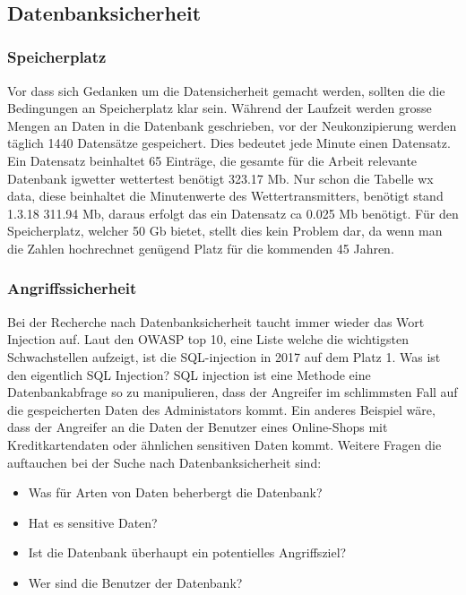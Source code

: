 \\

\subsection{Datenbanksicherheit}
\subsubsection{Speicherplatz}
Vor dass sich Gedanken um die Datensicherheit gemacht werden, sollten die die Bedingungen an Speicherplatz klar sein. Während der Laufzeit werden grosse Mengen an Daten in die Datenbank geschrieben, vor der Neukonzipierung werden täglich 1440 Datensätze gespeichert. Dies bedeutet jede Minute einen Datensatz. Ein Datensatz beinhaltet 65 Einträge, die gesamte für die Arbeit relevante Datenbank igwetter wettertest benötigt 323.17  Mb. Nur schon die Tabelle wx data, diese beinhaltet die Minutenwerte des Wettertransmitters, benötigt stand 1.3.18 311.94 Mb, daraus erfolgt das ein Datensatz ca 0.025 Mb benötigt. Für den Speicherplatz, welcher 50 Gb bietet, stellt dies kein Problem dar, da wenn man die Zahlen hochrechnet genügend Platz für die kommenden 45 Jahren.\\


\subsubsection{Angriffssicherheit}

Bei der Recherche nach Datenbanksicherheit taucht immer wieder das Wort Injection auf. Laut den OWASP top 10, eine Liste welche die wichtigsten Schwachstellen aufzeigt, ist die SQL-injection in 2017 auf dem Platz 1. Was ist den eigentlich SQL Injection? SQL injection ist eine Methode eine Datenbankabfrage so zu manipulieren, dass der Angreifer im schlimmsten Fall auf die gespeicherten Daten des Administators kommt. Ein anderes Beispiel wäre, dass der Angreifer an die Daten der Benutzer eines Online-Shops mit Kreditkartendaten oder ähnlichen sensitiven Daten kommt.
Weitere Fragen die auftauchen bei der Suche nach Datenbanksicherheit sind:
\begin{itemize}
\item Was für Arten von Daten beherbergt die Datenbank?
\item Hat es sensitive Daten?
\item Ist die Datenbank überhaupt ein potentielles Angriffsziel?
\item Wer sind die Benutzer der Datenbank?
\end{itemize}

